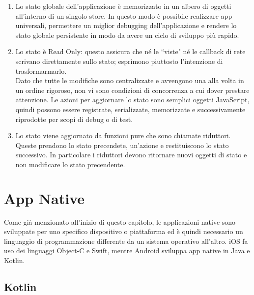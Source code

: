 \begin{enumerate}
      \item Lo stato globale dell'applicazione \`e memorizzato in un albero di oggetti all'interno di un singolo store. In questo modo \`e possibile realizzare app universali, permettere un miglior debugging dell'applicazione e
            rendere lo stato globale persistente in modo da avere un ciclo di sviluppo pi\`u rapido.
      \item Lo stato \`e Read Only: questo assicura che n\'e le ``viste" n\'e le callback di rete scrivano direttamente sullo stato; esprimono piuttosto l'intenzione di trasformarmarlo.
            \\Dato che tutte le modifiche sono centralizzate e avvengono una alla volta in un ordine rigoroso, non vi sono condizioni di concorrenza a cui dover prestare attenzione.
            Le azioni per aggiornare lo stato sono semplici oggetti JavaScript, quindi possono essere registrate, serializzate, memorizzate e successivamente riprodotte per scopi
            di debug o di test.
      \item Lo stato viene aggiornato da funzioni pure che sono chiamate riduttori. Queste prendono lo stato precendete, un'azione e restituiscono lo stato successivo.
            In particolare i riduttori devono ritornare nuovi oggetti di stato e non modificare lo stato precendente.

\end{enumerate}

\section{App Native}

Come gi\`a menzionato all'inizio di questo capitolo, le applicazioni native sono sviluppate per uno specifico dispositivo o piattaforma ed \`e quindi necessario un linguaggio di programmazione differente da un sistema operativo all'altro.
iOS fa uso dei linguaggi Object-C e Swift, mentre Android sviluppa app native in Java e Kotlin.
\subsection{Kotlin}

